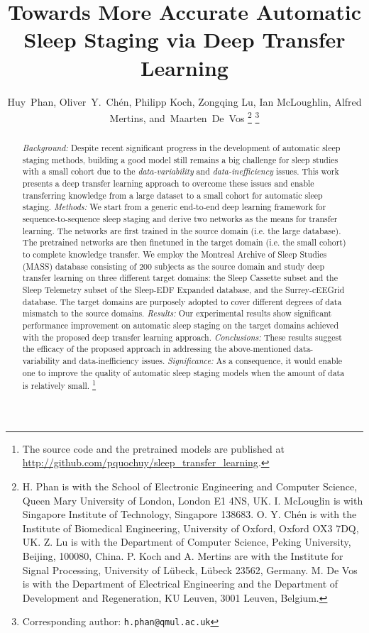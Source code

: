 \documentclass[journal,twoside,web]{ieeecolor}
\begin{document}
\title{Towards More Accurate Automatic Sleep Staging via Deep Transfer Learning}
\author{{Huy~Phan, Oliver~Y.~Ch\'{e}n, Philipp Koch, Zongqing Lu, Ian McLoughlin, Alfred Mertins, and~Maarten~De~Vos
\thanks{H. Phan is with the School of Electronic Engineering and Computer Science, Queen Mary University of London, London E1 4NS, UK. I. McLouglin is with Singapore Institute of Technology, Singapore 138683. O. Y. Ch\'{e}n is with the Institute of Biomedical Engineering, University of Oxford, Oxford OX3 7DQ, UK. Z. Lu is with the Department of Computer Science, Peking University, Beijing, 100080, China. P. Koch and A. Mertins are with the Institute for Signal Processing, University of L\"ubeck, L\"ubeck 23562, Germany. M. De Vos is with the Department of Electrical Engineering and the Department of Development and Regeneration, KU Leuven, 3001 Leuven, Belgium.}
\thanks{Corresponding author: {\tt\footnotesize h.phan@qmul.ac.uk}}
}}

\maketitle

\begin{abstract}
\emph{Background:} Despite recent significant progress in the development of automatic sleep staging methods, building a good model still remains a big challenge for sleep studies with a small cohort due to the \emph{data-variability} and \emph{data-inefficiency} issues. This work presents a deep transfer learning approach to overcome these issues and enable transferring knowledge from a large dataset to a small cohort for automatic sleep staging. \emph{Methods:} We start from a generic end-to-end deep learning framework for sequence-to-sequence sleep staging and derive two networks as the means for transfer learning. The networks are first trained in the source domain (i.e. the large database). The pretrained networks are then finetuned in the target domain (i.e. the small cohort) to complete knowledge transfer. We employ the Montreal Archive of Sleep Studies (MASS) database consisting of 200 subjects as the source domain and study deep transfer learning on three different target domains: the Sleep Cassette subset and the Sleep Telemetry subset of the Sleep-EDF Expanded database, and the Surrey-cEEGrid database. The target domains are purposely adopted to cover different degrees of data mismatch to the source domains. \emph{Results:} Our experimental results show significant performance improvement on automatic sleep staging on the target domains achieved with the proposed deep transfer learning approach. \emph{Conclusions:} These results suggest the efficacy of the proposed approach in addressing the above-mentioned data-variability and data-inefficiency issues. \emph{Significance:} As a consequence, it would enable one to improve the quality of automatic sleep staging models when the amount of data is relatively small.
\footnote{\footnotesize The source code and the pretrained models are published at \url{http://github.com/pquochuy/sleep_transfer_learning}.}
\end{abstract}
\end{document}
